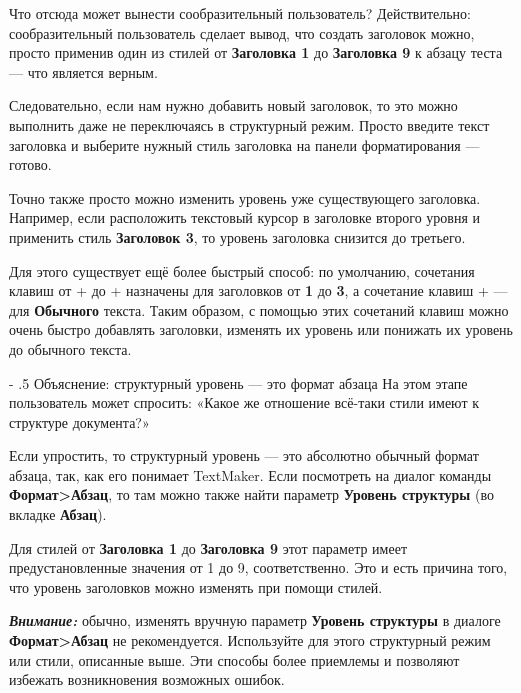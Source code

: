 ﻿\documentclass[a4paper,10pt]{article}
\makeatletter
\renewcommand\paragraph{%
   \@startsection{paragraph}{4}{0mm}%
      {-\baselineskip}%
      {.5\baselineskip}%
      {\normalfont\normalsize\bfseries}}
\makeatother
\begin{document}
Что отсюда может вынести сообразительный пользователь? Действительно: сообразительный пользователь сделает вывод, что создать заголовок можно, просто применив один из стилей от \textbf{Заголовка 1} до \textbf{Заголовка 9} к абзацу теста — что является верным.

Следовательно, если нам нужно добавить новый заголовок, то это можно выполнить даже не переключаясь в структурный режим. Просто введите текст заголовка и выберите нужный стиль заголовка на панели форматирования — готово.

Точно также просто можно изменить уровень уже существующего заголовка. Например, если расположить текстовый курсор в заголовке второго уровня и применить стиль \textbf{Заголовок 3}, то уровень заголовка снизится до третьего.

\begin{mdframed}[backgroundcolor=blue!10]
Для этого существует ещё более быстрый способ: по умолчанию, сочетания клавиш от + до + назначены для заголовков от \textbf{1} до \textbf{3}, а сочетание клавиш + — для \textbf{Обычного} текста. Таким образом, с помощью этих сочетаний клавиш можно очень быстро добавлять заголовки, изменять их уровень или понижать их уровень до обычного текста.
\end{mdframed}

\paragraph{Объяснение: структурный уровень — это формат абзаца}
На этом этапе пользователь может спросить: «Какое же отношение всё-таки стили имеют к структуре документа?»

Если упростить, то структурный уровень — это абсолютно обычный формат абзаца, так, как его понимает TextMaker. Если посмотреть на диалог команды \textbf{Формат>Абзац}, то там можно также найти параметр \textbf{Уровень структуры} (во вкладке \textbf{Абзац}).

Для стилей от \textbf{Заголовка 1} до \textbf{Заголовка 9} этот параметр имеет предустановленные значения от 1 до 9, соответственно. Это и есть причина того, что уровень заголовков можно изменять при помощи стилей.

\begin{mdframed}[backgroundcolor=blue!10]
\textbf{\textit{Внимание:}} обычно, изменять вручную параметр \textbf{Уровень структуры} в диалоге \textbf{Формат>Абзац} не рекомендуется. Используйте для этого структурный режим или стили, описанные выше. Эти способы более приемлемы и позволяют избежать возникновения возможных ошибок.
\end{mdframed}
\end{document}
